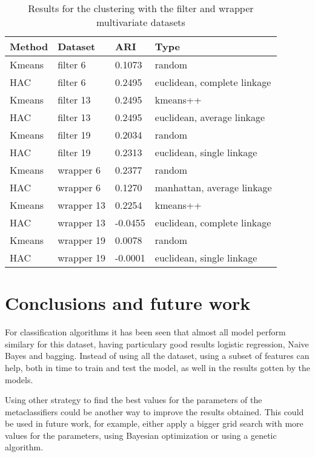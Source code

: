 \documentclass[a4paper,11pt]{article}
\begin{document}
\begin{table}
\centering
\begin{tabular}{|l|l|l|l|}
\hline

\textbf{Method} & \textbf{Dataset} & \textbf{ARI} & \textbf{Type} \\ \hline
Kmeans & filter 6 & 0.1073 & random \\ \hline
HAC & filter 6 & 0.2495 & euclidean, complete linkage \\ \hline
Kmeans & filter 13 & 0.2495 & kmeans++ \\ \hline
HAC & filter 13 & 0.2495 & euclidean, average linkage \\ \hline
Kmeans & filter 19 & 0.2034 & random \\ \hline
HAC & filter 19 & 0.2313 & euclidean, single linkage \\ \hline
Kmeans & wrapper 6 & 0.2377 & random \\ \hline
HAC & wrapper 6 & 0.1270 & manhattan, average linkage \\ \hline
Kmeans & wrapper 13 & 0.2254 & kmeans++ \\ \hline
HAC & wrapper 13 & -0.0455 & euclidean, complete linkage \\ \hline
Kmeans & wrapper 19 & 0.0078 & random \\ \hline
HAC & wrapper 19 & -0.0001 & euclidean, single linkage \\ \hline

\end{tabular}
\caption{Results for the clustering with the filter and wrapper multivariate datasets}
\label{cl:mul}
\end{table}


\section{Conclusions and future work}

For classification algorithms it has been seen that almost all model perform similary for this dataset, having particulary good results logistic regression, Naive Bayes and bagging. Instead of using all the dataset, using a subset of features can help, both in time to train and test the model, as well in the results gotten by the models.

Using other strategy to find the best values for the parameters of the metaclassifiers could be another way to improve the results obtained. This could be used in future work, for example, either apply a bigger grid search with more values for the parameters, using Bayesian optimization or using a genetic algorithm.
\end{document}
